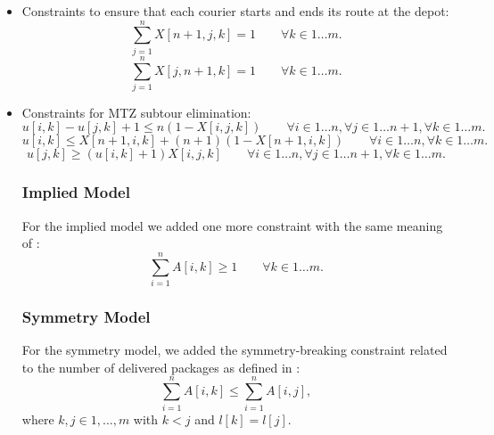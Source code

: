 \begin{itemize}
    \item Constraints to ensure that each courier starts and ends its route at the depot:
    \begin{equation}
        \sum_{j = 1}^{n} X[n+1,j,k] = 1 \qquad \forall k \in 1 \dots m.
    \end{equation}
    \begin{equation}
        \sum_{j = 1}^{n} X[j,n+1,k] = 1 \qquad \forall k \in 1 \dots m.
    \end{equation}

    \item Constraints for MTZ subtour elimination:
    \begin{equation}
        u[i,k] - u[j,k] + 1 \leq n(1 - X[i,j,k]) \qquad \forall i \in 1 \dots n, \forall j \in 1 \dots n+1, \forall k \in 1 \dots m.
    \end{equation}
    \begin{equation}
        u[i,k] \leq X[n+1,i,k] + (n+1)(1-X[n+1,i,k]) \qquad \forall i \in 1 \dots n, \forall k \in 1 \dots m.
    \end{equation}
    \begin{equation}
        u[j,k] \geq (u[i,k] + 1)X[i,j,k] \qquad \forall i \in 1 \dots n, \forall j \in 1 \dots n+1, \forall k \in 1 \dots m.
    \end{equation}

    \subsubsection{Implied Model}
    For the implied model we added one more constraint with the same meaning of :
    \begin{equation}
        \sum_{i = 1}^{n} A[i,k] \geq 1 \qquad \forall k \in 1 \dots m.
    \end{equation}
    
    \subsubsection{Symmetry Model}
    For the symmetry model, we added the symmetry-breaking constraint related to the number of delivered packages as defined in :
    \begin{equation}
        \sum_{i = 1}^{n} A[i,k] \leq \sum_{i = 1}^n A[i,j],
    \end{equation}
    where $k,j \in 1, \dots, m$ with $k < j$ and $l[k] = l[j]$.
\end{itemize}


